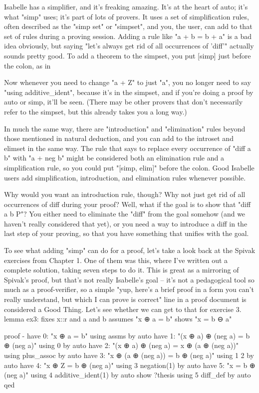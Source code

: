 Isabelle has a simplifier, and it's freaking amazing. It's at the heart of auto; it's what "simp" uses; it's part of lots of provers. It uses a set of simplification rules, often described as the "simp set" or "simpset", and you, the user, can add to that set of rules during a proving session. Adding a rule like "a + b = b + a" is a bad idea obviously, but saying "let's always get rid of all occurrences of 'diff'" actually sounds pretty good. To add a theorem to the simpset, you put [simp] just before the colon, as in 


Now whenever you need to change "a + Z" to just "a", you no longer need to say "using additive_ident", because it's in the simpset, and if you're doing a proof by auto or simp, it'll be seen. (There may be other provers that don't necessarily refer to the simpset, but this already takes you a long way.)

In much the same way, there are "introduction" and "elimination" rules beyond those mentioned in natural deduction, and you can add to the introset and elimset in the same way. The rule that says to replace every occurrence of "diff a b" with "a + neg b" might be considered both an elimination rule and a simplification rule, so you could put "[simp, elim]" before the colon. Good Isabelle users add simplification, introduction, and elimination rules whenever possible. 

Why would you want an introduction rule, though? Why not just get rid of all occurrences of diff during your proof? Well, what if the goal is to show that "diff a b \in P"? You either need to eliminate the "diff" from the goal somehow (and we haven't really considered that yet), or you need a way to introduce a diff in the last step of your proving, so that you have something that unifies with the goal. 

To see what adding "simp" can do for a proof, let's take a look back at the Spivak exercises from Chapter 1. One of them was this, where I've written out a complete solution, taking seven steps to do it. This is great as a mirroring of Spivak's proof, but that's not really Isabelle's goal -- it's not a pedagogical tool so much as a proof-verifier, so a simple "yup, here's a brief proof in a form you can't really understand, but which I can prove is correct" line in a proof document is considered a Good Thing. Let's see whether we can get to that for exercise 3. 
lemma ex3: 
  fixes x::r and a and b
  assumes "x ⊕ a = b"
  shows "x = b ⊖ a"

proof -
  have 0: "x ⊕ a = b" using assms by auto
  have 1: "(x ⊕ a) ⊕ (neg a) = b ⊕ (neg a)" using 0 by auto
  have 2: "(x ⊕ a) ⊕ (neg a) = x ⊕ (a ⊕ (neg a))" using plus_assoc by auto
  have 3: "x ⊕ (a ⊕ (neg a)) = b ⊕ (neg a)" using 1 2 by auto
  have 4: "x ⊕ Z = b ⊕ (neg a)" using 3 negation(1) by auto
  have 5: "x = b ⊕ (neg a)" using 4 additive_ident(1) by auto
  show ?thesis using 5 diff_def by auto
qed

